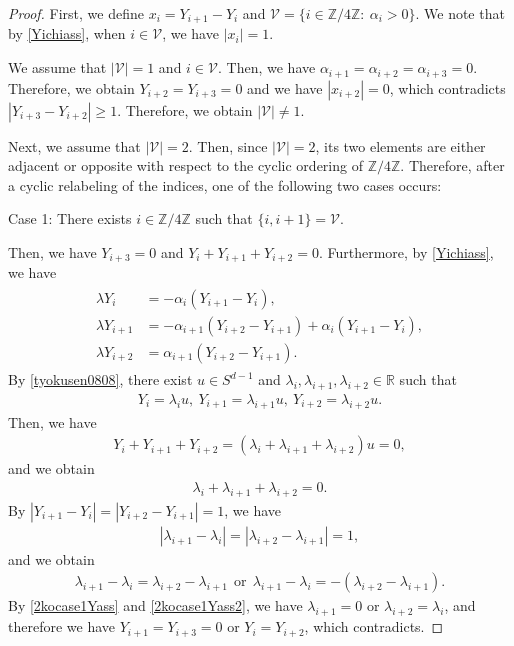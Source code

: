 \documentclass[10pt,a4paper]{amsart}
\numberwithin{equation}{section}
\begin{document}
\begin{proof}
First, we define $x_i=Y_{i+1}-Y_i$ and $\mathcal{V}=\{ i\in\mathbb{Z}/4\mathbb{Z}:\ \alpha_i>0\}$. We note that by \eqref{Yichiass}, when $i\in\mathcal{V}$, we have $|x_i|=1$. 

We assume that $|\mathcal{V}|=1$ and $i\in\mathcal{V}$. Then, we have $\alpha_{i+1}=\alpha_{i+2}=\alpha_{i+3}=0$. Therefore, we obtain $Y_{i+2}=Y_{i+3}=0$ and we have $|x_{i+2}|=0$, which contradicts $|Y_{i+3}-Y_{i+2}|\geq 1$. Therefore, we obtain $|\mathcal{V}|\neq 1$.

Next, we assume that $|\mathcal{V}|=2$. Then, since $|\mathcal{V}|=2$, its two elements are either adjacent or opposite with respect to the cyclic ordering of $\mathbb{Z}/4\mathbb{Z}$. Therefore, after a cyclic relabeling of the indices, one of the following two cases occurs:


Case 1: There exists $i\in\mathbb{Z}/4\mathbb{Z}$ such that $\{i,i+1\}=\mathcal{V}$.


Then, we have $Y_{i+3}=0$ and $Y_i+Y_{i+1}+Y_{i+2}=0$. Furthermore, by \eqref{Yichiass}, we have
\begin{align}\label{tyokusen0808}
\begin{aligned}
\lambda Y_i&=-\alpha_i\left(Y_{i+1}-Y_i\right),
\\
\lambda Y_{i+1}&=-\alpha_{i+1}\left(Y_{i+2}-Y_{i+1}\right)+\alpha_i\left(Y_{i+1}-Y_i\right),
\\
\lambda Y_{i+2}&=\alpha_{i+1}\left(Y_{i+2}-Y_{i+1}\right).
\end{aligned}
\end{align}
By \eqref{tyokusen0808}, there exist $u\in S^{d-1}$ and $\lambda_i,\lambda_{i+1},\lambda_{i+2}\in \mathbb{R}$ such that 
\begin{align*}
Y_i=\lambda_iu,\ Y_{i+1}=\lambda_{i+1}u,\ Y_{i+2}=\lambda_{i+2}u.
\end{align*}
Then, we have
\begin{align*}
Y_i+Y_{i+1}+Y_{i+2}=\left(\lambda_i+\lambda_{i+1}+\lambda_{i+2}\right)u=0,
\end{align*}
and we obtain 
\begin{align}\label{2kocase1Yass}
\lambda_i+\lambda_{i+1}+\lambda_{i+2}=0.
\end{align}
By $|Y_{i+1}-Y_i|=|Y_{i+2}-Y_{i+1}|=1$, we have 
\begin{align*}
\left|\lambda_{i+1}-\lambda_i\right|=\left|\lambda_{i+2}-\lambda_{i+1}\right|=1,
\end{align*}
and we obtain
\begin{align}\label{2kocase1Yass2}
\lambda_{i+1}-\lambda_i=\lambda_{i+2}-\lambda_{i+1}\ \ \mbox{or}\ \ \lambda_{i+1}-\lambda_i=-\left(\lambda_{i+2}-\lambda_{i+1}\right). 
\end{align}
By \eqref{2kocase1Yass} and \eqref{2kocase1Yass2}, we have $\lambda_{i+1}=0$ or $\lambda_{i+2}=\lambda_i$, and therefore we have $Y_{i+1}=Y_{i+3}=0$ or  $Y_i=Y_{i+2}$, which contradicts.



\end{proof}
\end{document}
